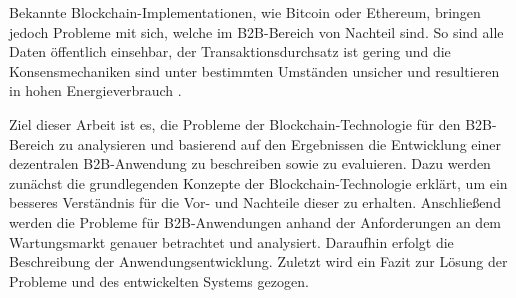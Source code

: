 Bekannte Blockchain-Implementationen, wie Bitcoin oder Ethereum, bringen jedoch Probleme mit sich, welche im B2B-Bereich von Nachteil sind. So sind alle Daten öffentlich einsehbar, der Transaktionsdurchsatz ist gering und die Konsensmechaniken sind unter bestimmten Umständen unsicher und resultieren in hohen Energieverbrauch \cite{AntonopoulosMasteringbitcoin2015}\cite{NakamotoBitcoinPeertoPeerElectronic2008}\cite{EthereumWhitepaper2017}. 

Ziel dieser Arbeit ist es, die Probleme der Blockchain-Technologie für den B2B-Bereich zu analysieren und basierend auf den Ergebnissen die Entwicklung einer dezentralen B2B-Anwendung zu beschreiben sowie zu evaluieren. Dazu werden zunächst die grundlegenden Konzepte der Blockchain-Technologie erklärt, um ein besseres Verständnis für die Vor- und Nachteile dieser zu erhalten. Anschließend werden die Probleme für B2B-Anwendungen anhand der Anforderungen an dem Wartungsmarkt genauer betrachtet und analysiert. Daraufhin erfolgt die Beschreibung der Anwendungsentwicklung. Zuletzt wird ein Fazit zur Lösung der Probleme und des entwickelten Systems gezogen.
